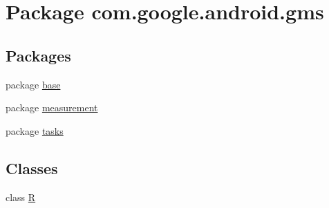 \hypertarget{namespacecom_1_1google_1_1android_1_1gms}{}\section{Package com.\+google.\+android.\+gms}
\label{namespacecom_1_1google_1_1android_1_1gms}
\subsection*{Packages}
\begin{DoxyCompactItemize}
\item 
package \mbox{\hyperlink{namespacecom_1_1google_1_1android_1_1gms_1_1base}{base}}
\item 
package \mbox{\hyperlink{namespacecom_1_1google_1_1android_1_1gms_1_1measurement}{measurement}}
\item 
package \mbox{\hyperlink{namespacecom_1_1google_1_1android_1_1gms_1_1tasks}{tasks}}
\end{DoxyCompactItemize}
\subsection*{Classes}
\begin{DoxyCompactItemize}
\item 
class \mbox{\hyperlink{classcom_1_1google_1_1android_1_1gms_1_1R}{R}}
\end{DoxyCompactItemize}
